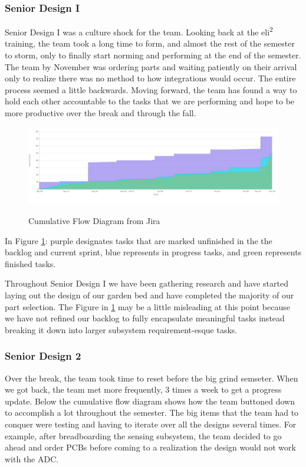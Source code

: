 \subsubsection{Senior Design I}
Senior Design I was a culture shock for the team. Looking back at the eli\textsuperscript{2} training, the team took a long time to form, and almost the rest of the semester to storm, only to finally start norming and performing at the end of the semester. The team by November was ordering parts and waiting patiently on their arrival only to realize there was no method to how integrations would occur. The entire process seemed a little backwards. Moving forward, the team has found a way to hold each other accountable to the tasks that we are performing and hope to be more productive over the break and through the fall.
\begin{figure}[H]
    \caption{Cumulative Flow Diagram from Jira}
    \centering
    \includegraphics[width=\textwidth]{images/Cumulative flow diagram.png}
    \label{fig:cumulativeflow}
\end{figure}
In Figure \ref{fig:cumulativeflow}: purple designates tasks that are marked unfinished in the the backlog and current sprint, blue represents in progress tasks, and green represents finished tasks.

Throughout Senior Design I we have been gathering research and have started laying out the design of our garden bed and have completed the majority of our part selection. The Figure in \ref{fig:cumulativeflow} may be a little misleading at this point because we have not refined our backlog to fully encapsulate meaningful tasks instead breaking it down into larger subsystem requirement-esque tasks.

\subsubsection{Senior Design 2}
Over the break, the team took time to reset before the big grind semseter.
When we got back, the team met more frequently, 3 times a week to get a progress update. Below the cumulative flow diagram shows how the team buttoned down to accomplish a lot throughout the semester.
The big items that the team had to conquer were testing and having to iterate over all the designs several times.
For example, after breadboarding the sensing subsystem, the team decided to go ahead and order PCBs before coming to a realization the design would not work with the ADC.

